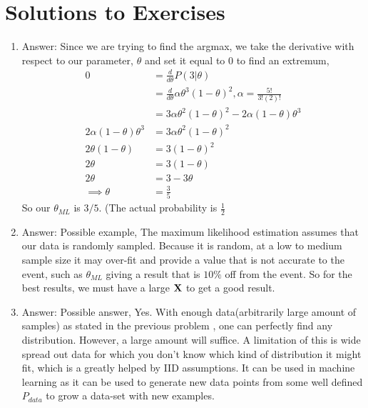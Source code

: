 \section{Solutions to Exercises}
\begin{enumerate}
    \item Answer: Since we are trying to find the argmax, we take the derivative with respect to our parameter, $\theta$ and set it equal to 0 to find an extremum,
    \begin{align*}
        0 & = \frac{d}{d\theta}P(3| \theta)\\
         &= \frac{d}{d\theta}\alpha\theta^3(1-\theta)^2, \alpha = \frac{5!}{3!(2)!}\\
         &=3\alpha \theta^2(1-\theta)^2 - 2\alpha(1-\theta)\theta^3 \\
        2\alpha(1-\theta)\theta^3 & = 3\alpha \theta^2(1-\theta)^2 \\
        2\theta(1-\theta) &= 3(1-\theta)^2 \\
        2\theta &= 3(1-\theta) \\
        2\theta &= 3 - 3\theta \\
        \implies \theta &= \frac{3}{5}
    \end{align*}
    So our $\theta_{ML}$ is $3/5$.  (The actual probability is $\frac{1}{2}$ \\
    \item Answer: Possible example, The maximum likelihood estimation assumes that our data is randomly sampled. Because it is random, at a low to medium sample size it may over-fit and provide a value that is not accurate to the event, such as $\theta_{ML}$ giving a result that is $10\%$ off from the event. So for the best results, we must have a large $\MX$ to get a good result. \\
    \item Answer: Possible answer, Yes. With enough data(arbitrarily large amount of samples) as stated in the previous problem , one can perfectly find any distribution. However, a large amount will suffice. A limitation of this is wide spread out data for which you don't know which kind of distribution it might fit, which is a greatly helped by IID assumptions. It can be used in machine learning as it can be used to generate new data points from some well defined $P_{data}$ to grow a data-set with new examples. 
\end{enumerate}
